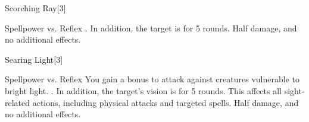 \begin{spellsection}{Scorching Ray}[3]
    \begin{spellheader}
    \end{spellheader}
    \begin{spellcontent}
        \begin{spelltargetinginfo}
        \end{spelltargetinginfo}
        \begin{spelleffects}
            \begin{spellattack}{Spellpower vs. Reflex}
                \spellsuccess {}. In addition, the target is \ignited for 5 rounds.
                \spellfailure Half damage, and no additional effects.
            \end{spellattack}
        \end{spelleffects}
    \end{spellcontent}
    \begin{spellfooter}
        \miscastrandom
    \end{spellfooter}
\end{spellsection}

\begin{spellsection}{Searing Light}[3]
    \begin{spellheader}
    \end{spellheader}
    \begin{spellcontent}
        \begin{spelltargetinginfo}
        \end{spelltargetinginfo}
        \begin{spelleffects}
            \begin{spellattack}{Spellpower vs. Reflex}
                \spellspecial You gain a  bonus to attack against creatures vulnerable to bright light.
                \spellsuccess {}. In addition, the target's vision is \impaired for 5 rounds. This affects all sight-related actions, including physical attacks and targeted spells.
                \spellfailure Half damage, and no additional effects.
            \end{spellattack}
        \end{spelleffects}
    \end{spellcontent}
    \begin{spellfooter}
        \miscastrandom
    \end{spellfooter}
\end{spellsection}

